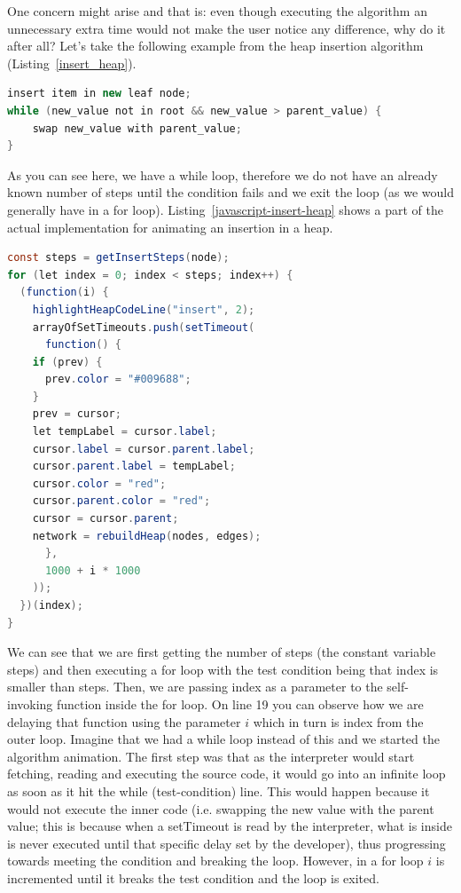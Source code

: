 \documentclass{l4proj}
\begin{document}
One concern might arise and that is: even though executing the algorithm an unnecessary extra time would not make the
user notice any difference, why do it after all? Let's take the following example from the heap insertion algorithm
(Listing~\ref{insert_heap}).

\begin{lstlisting}[language={Java}, label={insert_heap},caption={Pseudocode for inserting a node in a heap.}]
insert item in new leaf node; 
while (new_value not in root && new_value > parent_value) {
    swap new_value with parent_value;
}
\end{lstlisting}

As you can see here, we have a while loop, therefore we do not have an already known number of steps until the
condition fails and we exit the loop (as we would generally have in a for loop). Listing~\ref{javascript-insert-heap}
shows a part of the actual implementation for
animating an insertion in a heap.

\begin{lstlisting}[language={Java}, label={javascript-insert-heap}, caption={Actual implementation for animating the
insertion of a heap node.}]
const steps = getInsertSteps(node);
for (let index = 0; index < steps; index++) {
  (function(i) {
    highlightHeapCodeLine("insert", 2);
    arrayOfSetTimeouts.push(setTimeout(
      function() {
	if (prev) {
	  prev.color = "#009688";
	}
	prev = cursor;
	let tempLabel = cursor.label;
	cursor.label = cursor.parent.label;
	cursor.parent.label = tempLabel;
	cursor.color = "red";
	cursor.parent.color = "red";
	cursor = cursor.parent;
	network = rebuildHeap(nodes, edges);
      },
      1000 + i * 1000
    ));
  })(index);
}
\end{lstlisting}

We can see that we are first getting the number of steps (the constant variable steps) and then executing a for loop with the test condition being
that index is smaller than steps. Then, we are passing index as a parameter to the self-invoking function inside the
for loop. On line 19 you can observe how we are delaying that function using the parameter $i$ which in turn is index
from the outer loop. Imagine that we had a while loop instead of this and we started the algorithm animation. The first
step was that as the interpreter would start fetching, reading and executing the source code, it would go into an
infinite loop as soon as it hit the while (test-condition) line. This would happen because it would not execute the
inner code (i.e. swapping the new value with the parent value; this is because when a setTimeout is read by the
interpreter, what is
inside is never executed until that specific delay set by the developer), thus progressing towards meeting the condition and
breaking the loop. However, in
a for loop $i$ is incremented until it breaks the test condition and the loop is exited.
\end{document}
